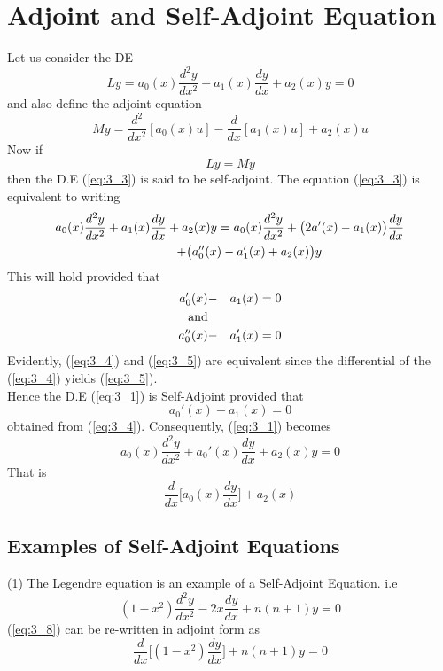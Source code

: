 \documentclass[12pt]{report}
\newcommand{\sps}{\\[0.2cm]}
\newcommand{\refn}[1]{(\ref{#1})}
\newcommand{\refx}[1]{\refn{eq:#1}}
\newcommand{\sprime}{'}
\newcommand{\dprime}{''}
\begin{document}
	\section{Adjoint and Self-Adjoint Equation}
	Let us consider the DE
	\begin{equation}
		Ly = a_0(x) \frac{d^2y}{dx^2} + a_1(x)\frac{dy}{dx} + a_2(x)y = 0 \label{eq:3_1}
	\end{equation}
	and also define the adjoint equation
	\begin{equation}
		My = \frac{d^2}{dx^2}[a_0(x)u] - \frac{d}{dx}[a_1(x)u] + a_2(x)u \label{eq:3_2}
	\end{equation}
	Now if
	\begin{equation}
		Ly = My \label{eq:3_3}
	\end{equation}
	then the D.E \refx{3_3} is said to be self-adjoint. The equation \refx{3_3} is equivalent to writing 
	\begin{eqnarray}
		a_0(x)\frac{d^2y}{dx^2} + a_1(x)\frac{dy}{dx} + a_2(x)y = a_0(x)\frac{d^2y}{dx^2} + \big(2a\sprime(x) - a_1(x)\big)\frac{dy}{dx}\notag \\
		+ \big(a_0\dprime(x) - a_1\sprime(x) + a_2(x)\big)y \notag ~~~~~~~~~~~~~~~~~~~~
	\end{eqnarray}
	This will hold provided that
	\begin{eqnarray}
		a_0\sprime(x) &-& a_1(x) = 0  \label{eq:3_4}\\
		\text{and} \notag \\
		a_0\dprime(x) &-& a_1\sprime(x) = 0 \label{eq:3_5}
	\end{eqnarray}
	Evidently, \refx{3_4} and \refx{3_5} are equivalent since the differential of the \refx{3_4} yields \refx{3_5}.\sps
	Hence the D.E \refx{3_1} is Self-Adjoint provided that 
	\begin{equation}
		a_0\sprime(x) - a_1(x) = 0  \label{eq:3_6}
	\end{equation}
	obtained from \refx{3_4}. Consequently, \refx{3_1} becomes
	\begin{equation*}
		a_0(x)\frac{d^2y}{dx^2} + a_0\sprime(x)\frac{dy}{dx} + a_2(x)y = 0
	\end{equation*}
	That is
	\begin{equation}
		\frac{d}{dx}\Big[a_0(x)\frac{dy}{dx}\Big] + a_2(x) \label{eq:3_7}
	\end{equation}
	\newpage
	
	\subsection{Examples of Self-Adjoint Equations}
	(1) The Legendre equation is an example of a Self-Adjoint Equation.
	i.e
	\begin{equation}
		(1-x^2)\frac{d^2y}{dx^2} - 2x \frac{dy}{dx} + n(n+1)y = 0 \label{eq:3_8}
	\end{equation}
	\refx{3_8} can be re-written in adjoint form as
	\begin{equation*}
		\frac{d}{dx}\Big[(1-x^2)\frac{dy}{dx}\Big] + n(n+1)y = 0
	\end{equation*}
	
\end{document}
